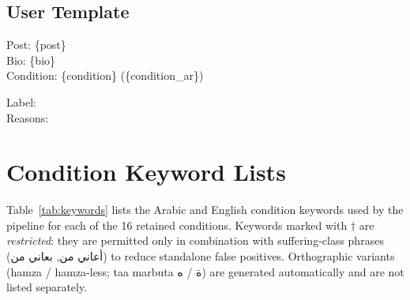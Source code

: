 \documentclass[11pt]{article}
\begin{document}
\subsection*{User Template}

\begin{tcolorbox}[
  breakable,
  enhanced,
  colback=gray!5,
  colframe=gray!50,
  fontupper=\small\ttfamily,
  coltitle=black,
  attach boxed title to top left={yshift=-2mm, xshift=4mm},
  boxed title style={colback=gray!20, colframe=gray!50}
]
Post: \{post\}\\
Bio: \{bio\}\\
Condition: \{condition\} (\{condition\_ar\})

\medskip
Label:\\
Reasons:
\end{tcolorbox}


\section{Condition Keyword Lists}
\label{app:keywords}

Table~\ref{tab:keywords} lists the Arabic and English condition
keywords used by the pipeline for each of the 16 retained conditions.
Keywords marked with $\dagger$ are \textit{restricted}: they are
permitted only in combination with suffering-class phrases
(\foreignlanguage{arabic}{أعاني من}, \foreignlanguage{arabic}{بعاني من})
to reduce standalone false positives. Orthographic variants (hamza /
hamza-less; taa marbuta \foreignlanguage{arabic}{ة} /
\foreignlanguage{arabic}{ه}) are generated automatically and are not
listed separately.
\end{document}
